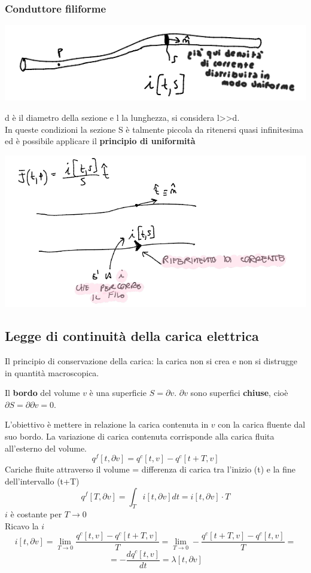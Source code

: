 \subsubsection{Conduttore filiforme}
    \begin{center}
        \includegraphics[width=0.5\linewidth]{immagini/image6.png}    
    \end{center}
    d è il diametro della sezione e l la lunghezza, si considera l>>d.\\
    In queste condizioni la sezione S è talmente piccola da ritenersi quasi infinitesima ed è possibile applicare il \textbf{principio di uniformità}
    \begin{center}
        \includegraphics[width=0.5\linewidth]{immagini/image5.png}  
    \end{center}

\subsection{Legge di continuità della carica elettrica}
    Il principio di conservazione della carica: la carica non si crea e non si distrugge in quantità macroscopica.

    Il \textbf{bordo} del volume $v$ è una superficie $S=\partial v$. $\partial v$ sono superfici \textbf{chiuse}, cioè $\partial S = \partial\partial v = 0$.

    L'obiettivo è mettere in relazione la carica contenuta in $v$ con la carica fluente dal suo bordo. La variazione di carica contenuta corrisponde alla carica fluita all'esterno del volume.
    \[
        q^f[t,\partial v] = q^c[t,v] - q^c[t+T,v]
    \]
    Cariche fluite attraverso il volume = differenza di carica tra l'inizio (t) e la fine dell'intervallo (t+T)
    \[
        q^f[T,\partial v] = \int_T i[t,\partial v]dt = i[t, \partial v]\cdot T
    \]
    $i$ è costante per $T\to0$\\
    Ricavo la $i$
    \[
        i[t,\partial v] = \lim_{T\to0} \frac{q^c[t,v] - q^c[t+T, v]}{T} = \lim_{T\to0} -\frac{q^c[t+T,v]- q^c[t,v]}{T}=
    \]
    \[
        = -\frac{dq^c[t,v]}{dt} = \lambda[t,\partial v]
    \]

